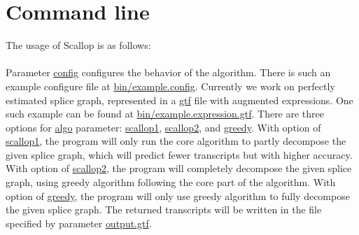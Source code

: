 \documentclass{llncs}
\begin{document}
\section{Command line}
The usage of Scallop is as follows:\\
\\
Parameter \url{config} configures the behavior of the algorithm.
There is such an example configure file at \url{bin/example.config}.
Currently we work on perfectly estimated splice graph, represented in a \url{gtf} file with
augmented expressions. One such example can be found at \url{bin/example.expression.gtf}.
There are three options for \url{algo} parameter: \url{scallop1}, \url{scallop2}, and \url{greedy}.
With option of \url{scallop1}, the program will only run the core algorithm to partly
decompose the given splice graph, which will predict fewer transcripts but with
higher accuracy. With option of \url{scallop2}, the program will completely
decompose the given splice graph, using greedy algorithm following the core part of the algorithm.
With option of \url{greedy}, the program will only use greedy algorithm to fully decompose
the given splice graph.
The returned transcripts will be written in the file specified by parameter \url{output.gtf}.

\end{document}
